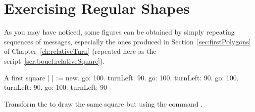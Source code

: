 



\section{Exercising Regular Shapes}
As you may have noticed, some figures can be obtained by simply
repeating sequences of messages, especially the ones produced in
Section~\ref{sec:firstPolygons} of Chapter~\ref{ch:relativeTurn} (repeated here as the script~\ref{scr:boucl:relativeSquare}). 


\begin{scriptwithtitle}{A first square} \label{scr:boucl:relativeSquare}
| \caro |
\caro := \Turtle new.
\caro go: 100.
\caro turnLeft: 90.
\caro go: 100.
\caro turnLeft: 90.
\caro go: 100.
\caro turnLeft: 90.
\caro go: 100.
\caro turnLeft: 90
\end{scriptwithtitle}


\begin{exonofig}\label{exo:squareRepeat}
Transform the  to
draw the same square but using the command \timesRepeat.
\end{exonofig}

